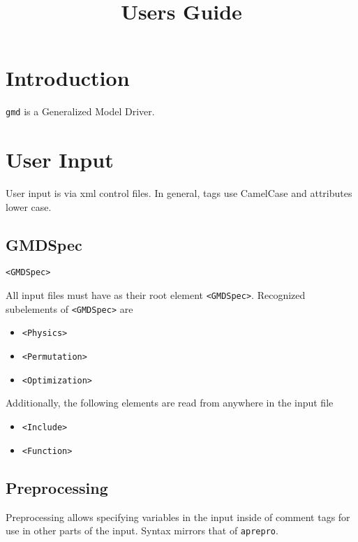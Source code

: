 \documentclass[11pt]{report}
\title{\gmd{} Users Guide}
\newcommand{\gmd}{\texttt{gmd}}
\newcommand{\tag}[1]{\texttt{<#1>}}
\begin{document}
\maketitle

\chapter{Introduction}
\gmd{} is a Generalized Model Driver.

\chapter{User Input}
User input is via xml control files. In general, tags use CamelCase and
attributes lower case.

\section{GMDSpec}
\begin{verbatim}
<GMDSpec>
\end{verbatim}
%
All input files must have as their root element \tag{GMDSpec}. Recognized
subelements of \tag{GMDSpec} are
%
\begin{itemize}
  \item \tag{Physics}
  \item \tag{Permutation}
  \item \tag{Optimization}
\end{itemize}

Additionally, the following elements are read from anywhere in the input file
%
\begin{itemize}
  \item \tag{Include}
  \item \tag{Function}
\end{itemize}

\section{Preprocessing}
Preprocessing allows specifying variables in the input inside of comment tags
for use in other parts of the input. Syntax mirrors that of \texttt{aprepro}.
\end{document}
